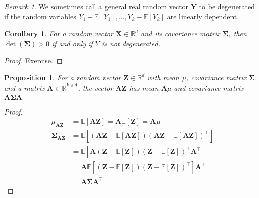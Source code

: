 \documentclass{article}
\newtheorem{corollary}{Corollary}
\newtheorem{proposition}{Proposition}
\newcommand{\R}{\mathbb{R}}
\DeclareMathOperator*{\1}{\mathbbm{1}}
\newcommand{\E}{\mathbb E}
\renewcommand{\b}[1]{\mathbf{#1}}
\theoremstyle{definition}
\theoremstyle{remark}
\newtheorem{remark}{Remark}
\newcommand{\bSig}{\mathbf{\Sigma}}
\begin{document}
  \begin{remark}
    We sometimes call a general real random vector $\b Y$ to be degenerated if the random variables $Y_1-\E[Y_1],...,Y_k-\E[Y_k]$ are linearly dependent.
  \end{remark}
  \begin{corollary}
    For a random vector $\mathbf X\in \R^d$ and its covariance matrix $\bSig$, then $\det(\bSig) >0 $ if and only if $Y$ is not degenerated.
  \end{corollary}
  \begin{proof}
    Exercise.
  \end{proof}
  \begin{proposition}\label{prop:cov_linear_transform}
    For a random vector $\b Z\in \R^d$ with mean $\mu$, covariance matrix $\bSig$ and a matrix $\b A\in \R^{k\times d}$, the vector $\b A\b Z$ has mean $\b A\mu$ and covariance matrix $\b A\bSig\b A^\top$
  \end{proposition}
  \begin{proof}
    \begin{align*}
      \mu_{\b A \b Z} &= \E[\b A\b Z] = \b A\E[\b Z]=\b A\mu\\
      \bSig_{\b A\b Z}&=\E[(\b A\b Z-\E[\b A\b Z])(\b A\b Z-\E[\b A\b Z])^\top]\\
      &=\E[\b A(\b Z-\E[\b Z])(\b Z-\E[\b Z])^\top\b A^\top]\\
      &=\b A\E[(\b Z-\E[\b Z])(\b Z-\E[\b Z])^\top]\b A^\top\\
      &=\b A \bSig \b A^\top
    \end{align*}
  \end{proof}
\end{document}
